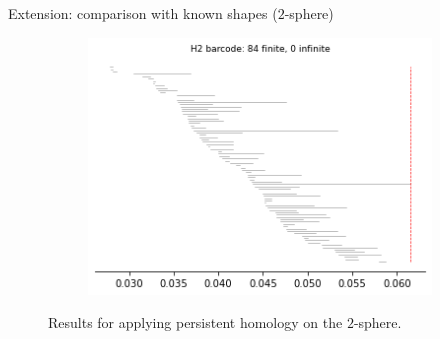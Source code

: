 \documentclass[xcolor={dvipsnames,svgnames}]{beamer}
\begin{document}
\begin{frame}{Extension: comparison with known shapes ($2$-sphere)}
\begin{figure}[H]
\begin{subfigure}[b]{0.2\textwidth}
\includegraphics[width=\textwidth]{figures/dsphere_H2_barcode.png}
 \caption{}
\end{subfigure}
\caption{Results for applying persistent homology on the $2$-sphere.}
\end{figure}
\end{frame}
\end{document}
